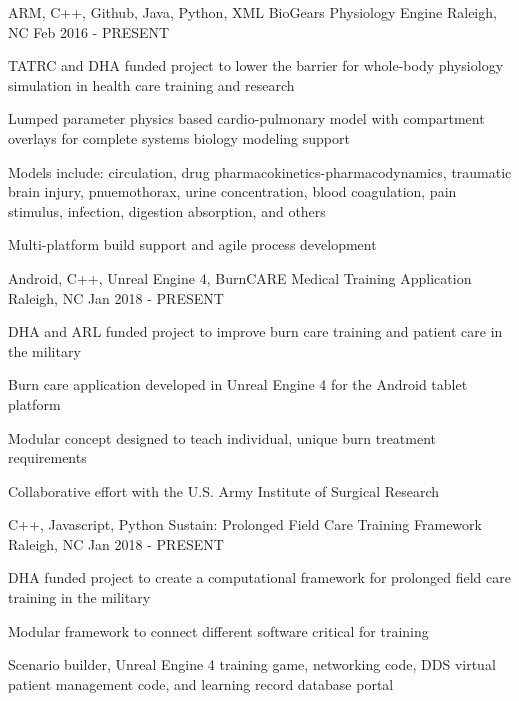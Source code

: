 
\begin{cventries}

  \cventry
    {ARM, C++, Github, Java, Python, XML} %
    {BioGears Physiology Engine} %
    {Raleigh, NC} %
    {Feb 2016 - PRESENT} %
    {
      \begin{cvitems} %
      \item{TATRC and DHA funded project to lower the barrier for whole-body physiology simulation in health care training and research}
        \item {Lumped parameter physics based cardio-pulmonary model with compartment overlays for complete systems biology modeling support}
        \item {Models include: circulation, drug pharmacokinetics-pharmacodynamics, traumatic brain injury, pnuemothorax, urine concentration, blood coagulation, pain stimulus, infection, digestion absorption, and others}
		    \item {Multi-platform build support and agile process development}
      \end{cvitems}
    }

  \cventry
    {Android, C++, Unreal Engine 4,} %
    {BurnCARE Medical Training Application} %
    {Raleigh, NC} %
    {Jan 2018 - PRESENT} %
    {
      \begin{cvitems} %
      \item{DHA and ARL funded project to improve burn care training and patient care in the military}
      	\item {Burn care application developed in Unreal Engine 4 for the Android tablet platform}
		    \item {Modular concept designed to teach individual, unique burn treatment requirements}
        \item {Collaborative effort with the U.S. Army Institute of Surgical Research}
      \end{cvitems}
    }

  \cventry
    {C++, Javascript, Python} %
    {Sustain: Prolonged Field Care Training Framework } %
    {Raleigh, NC} %
    {Jan 2018 - PRESENT} %
    {
      \begin{cvitems} %
      \item {DHA funded project to create a computational framework for prolonged field care training in the military}
        \item {Modular framework to connect different software critical for training}
        \item {Scenario builder, Unreal Engine 4 training game, networking code, DDS virtual patient management code, and learning record database portal}
      \end{cvitems}
    }


\end{cventries}
